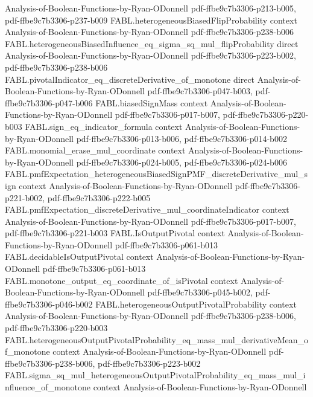 \begin{theorem}
  {Analysis-of-Boolean-Functions-by-Ryan-ODonnell}
  {pdf-ffbe9c7b3306-p213-b005,
    pdf-ffbe9c7b3306-p237-b009}
\proofstep
  {FABL.heterogeneousBiasedFlipProbability}
  {context}
  {Analysis-of-Boolean-Functions-by-Ryan-ODonnell}
  {pdf-ffbe9c7b3306-p238-b006}
\proofstep
  {FABL.heterogeneousBiasedInfluence_eq_sigma_sq_mul_flipProbability}
  {direct}
  {Analysis-of-Boolean-Functions-by-Ryan-ODonnell}
  {pdf-ffbe9c7b3306-p223-b002,
    pdf-ffbe9c7b3306-p238-b006}
\proofstep
  {FABL.pivotalIndicator_eq_discreteDerivative_of_monotone}
  {direct}
  {Analysis-of-Boolean-Functions-by-Ryan-ODonnell}
  {pdf-ffbe9c7b3306-p047-b003,
    pdf-ffbe9c7b3306-p047-b006}
\proofstep
  {FABL.biasedSignMass}
  {context}
  {Analysis-of-Boolean-Functions-by-Ryan-ODonnell}
  {pdf-ffbe9c7b3306-p017-b007,
    pdf-ffbe9c7b3306-p220-b003}
\proofstep
  {FABL.sign_eq_indicator_formula}
  {context}
  {Analysis-of-Boolean-Functions-by-Ryan-ODonnell}
  {pdf-ffbe9c7b3306-p013-b006,
    pdf-ffbe9c7b3306-p014-b002}
\proofstep
  {FABL.monomial_erase_mul_coordinate}
  {context}
  {Analysis-of-Boolean-Functions-by-Ryan-ODonnell}
  {pdf-ffbe9c7b3306-p024-b005,
    pdf-ffbe9c7b3306-p024-b006}
\proofstep
  {FABL.pmfExpectation_heterogeneousBiasedSignPMF_discreteDerivative_mul_sign}
  {context}
  {Analysis-of-Boolean-Functions-by-Ryan-ODonnell}
  {pdf-ffbe9c7b3306-p221-b002,
    pdf-ffbe9c7b3306-p222-b005}
\proofstep
  {FABL.pmfExpectation_discreteDerivative_mul_coordinateIndicator}
  {context}
  {Analysis-of-Boolean-Functions-by-Ryan-ODonnell}
  {pdf-ffbe9c7b3306-p017-b007,
    pdf-ffbe9c7b3306-p221-b003}
\proofstep
  {FABL.IsOutputPivotal}
  {context}
  {Analysis-of-Boolean-Functions-by-Ryan-ODonnell}
  {pdf-ffbe9c7b3306-p061-b013}
\proofstep
  {FABL.decidableIsOutputPivotal}
  {context}
  {Analysis-of-Boolean-Functions-by-Ryan-ODonnell}
  {pdf-ffbe9c7b3306-p061-b013}
\proofstep
  {FABL.monotone_output_eq_coordinate_of_isPivotal}
  {context}
  {Analysis-of-Boolean-Functions-by-Ryan-ODonnell}
  {pdf-ffbe9c7b3306-p045-b002,
    pdf-ffbe9c7b3306-p046-b002}
\proofstep
  {FABL.heterogeneousOutputPivotalProbability}
  {context}
  {Analysis-of-Boolean-Functions-by-Ryan-ODonnell}
  {pdf-ffbe9c7b3306-p238-b006,
    pdf-ffbe9c7b3306-p220-b003}
\proofstep
  {FABL.heterogeneousOutputPivotalProbability_eq_mass_mul_derivativeMean_of_monotone}
  {context}
  {Analysis-of-Boolean-Functions-by-Ryan-ODonnell}
  {pdf-ffbe9c7b3306-p238-b006,
    pdf-ffbe9c7b3306-p223-b002}
\proofstep
  {FABL.sigma_sq_mul_heterogeneousOutputPivotalProbability_eq_mass_mul_influence_of_monotone}
  {context}
  {Analysis-of-Boolean-Functions-by-Ryan-ODonnell}

\end{theorem}
